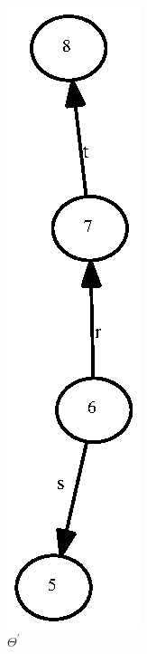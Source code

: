 \documentclass[a4paper,12pt]{article}
\numberwithin{equation}{section}
\numberwithin{figure}{section}
\begin{document}
\begin{figure}
\begin{center}
\begin{subfigure}[b]{.3\columnwidth}
\includegraphics[scale=0.5, angle=90, bb=0 0  82 280]{python/ex_K_Y1.eps}
\caption{$\Theta^\prime$}
\label{fig:KY1}
\end{subfigure}
\hspace*{2cm}
\begin{subfigure}[b]{.3\columnwidth}

\end{subfigure}
\end{center}
\end{figure}
\end{document}
